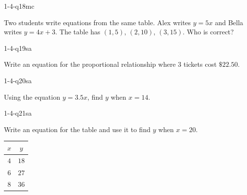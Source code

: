 \begin{practiceQuestion}{1-4-q18}{mc}
\begin{questionText}
Two students write equations from the same table. Alex writes $y = 5x$ and Bella writes $y = 4x + 3$. The table has $(1, 5)$, $(2, 10)$, $(3, 15)$. Who is correct?
\end{questionText}
\end{practiceQuestion}


\begin{practiceQuestion}{1-4-q19}{sa}
\begin{questionText}
Write an equation for the proportional relationship where $3$ tickets cost $\$22.50$.
\end{questionText}
\end{practiceQuestion}

\begin{practiceQuestion}{1-4-q20}{sa}
\begin{questionText}
Using the equation $y = 3.5x$, find $y$ when $x = 14$.
\end{questionText}
\end{practiceQuestion}

\begin{practiceQuestion}{1-4-q21}{sa}
\begin{questionText}
Write an equation for the table and use it to find $y$ when $x = 20$.

\begin{center}
\begin{tabular}{|c|c|}
\hline $x$ & $y$ \\ \hline $4$ & $18$ \\ $6$ & $27$ \\ $8$ & $36$ \\ \hline
\end{tabular}
\end{center}
\end{questionText}
\end{practiceQuestion}

